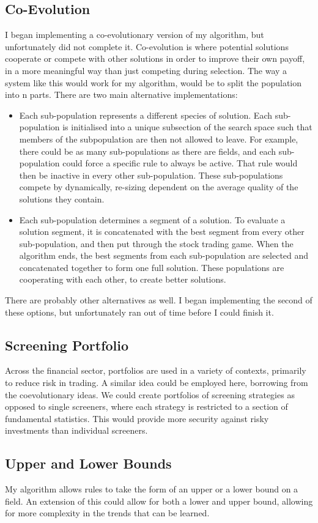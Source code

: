 \subsection{Co-Evolution}
I began implementing a co-evolutionary version of my algorithm, but unfortunately did not complete it. Co-evolution is where potential solutions cooperate or compete with other solutions in order to improve their own payoff, in a more meaningful way than just competing during selection. The way a system like this would work for my algorithm, would be to split the population into n parts. There are two main alternative implementations:
\begin{itemize}
    \item Each sub-population represents a different species of solution. Each sub-population is initialised into a unique subsection of the search space such that members of the subpopulation are then not allowed to leave. For example, there could be as many sub-populations as there are fields, and each sub-population could force a specific rule to always be active. That rule would then be inactive in every other sub-population. These sub-populations compete by dynamically, re-sizing dependent on the average quality of the solutions they contain.
    \newline
    \newline
    \item Each sub-population determines a segment of a solution. To evaluate a solution segment, it is concatenated with the best segment from every other sub-population, and then put through the stock trading game. When the algorithm ends, the best segments from each sub-population are selected and concatenated together to form one full solution. These populations are cooperating with each other, to create better solutions.
\end{itemize}

\noindent There are probably other alternatives as well. I began implementing the second of these options, but unfortunately ran out of time before I could finish it.

\subsection{Screening Portfolio}
Across the financial sector, portfolios are used in a variety of contexts, primarily to reduce risk in trading. A similar idea could be employed here, borrowing from the coevolutionary ideas. We could create portfolios of screening strategies as opposed to single screeners, where each strategy is restricted to a section of fundamental statistics. This would provide more security against risky investments than individual screeners.

\subsection{Upper and Lower Bounds}
My algorithm allows rules to take the form of an upper or a lower bound on a field. An extension of this could allow for both a lower and upper bound, allowing for more complexity in the trends that can be learned.
